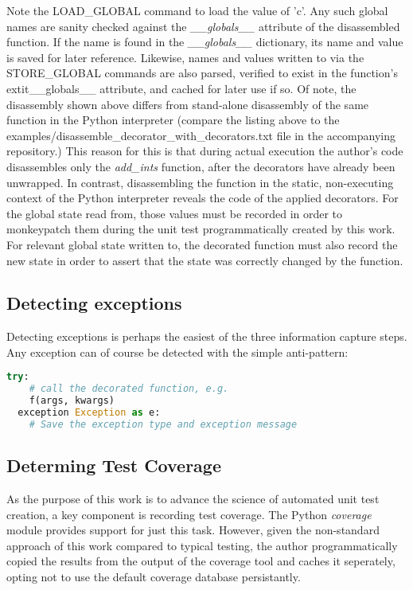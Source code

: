 

Note the LOAD\_GLOBAL command to load the value of 'c'.  Any such global names 
are sanity checked against the \textit{\_\_globals\_\_} attribute of the disassembled function.
%
If the name is found in the \textit{\_\_globals\_\_} dictionary, its name and value is saved for later reference.  Likewise, names and values written to via the STORE\_GLOBAL commands are also parsed, verified to exist in the function's extit{\_\_globals\_\_} attribute, and cached for later use if so.
%
Of note, the disassembly shown above differs from stand-alone disassembly of the same function in the Python interpreter (compare the listing above to the examples/disassemble\_decorator\_with\_decorators.txt file in the accompanying repository.)
This reason for this is that during actual execution the author's code disassembles only the \textit{add\_ints} function, after the decorators have already been unwrapped.
In contrast, disassembling the function in the static, non-executing context of
the Python interpreter reveals the code of the applied decorators.  
%
For the global state read from, those values must be recorded 
in order to monkeypatch them during the unit test programmatically 
created by this work.
%
For relevant global state written to, the decorated function must also record
the new state in order to assert that the state was correctly changed by the function.

\subsection{Detecting exceptions}\label{sec:approach-internal-3}
Detecting exceptions is perhaps the easiest of the three information capture steps.
Any exception can of course be detected with the simple anti-pattern:

\begin{lstlisting}[language=Python]
  try:
    # call the decorated function, e.g.
    f(args, kwargs)
  exception Exception as e:
    # Save the exception type and exception message
  \end{lstlisting}

\subsection{Determing Test Coverage}\label{sec:approach-internal-4}
As the purpose of this work is to advance the science of automated unit test 
creation, a key component is recording test coverage.  The Python \textit{coverage}
module provides support for just this task. However, given the non-standard
approach of this work compared to typical testing, the author programmatically
copied the results from the output of the coverage tool and caches it seperately, 
opting not to use the default coverage database persistantly.

